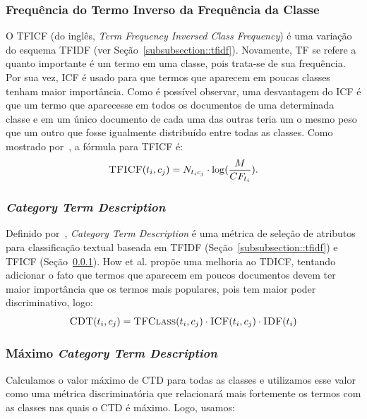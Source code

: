 \subsubsection{Frequência do Termo Inverso da Frequência da Classe}%
\label{subsubsection::tficf}

O \textsc{TFICF} (do inglês, \textit{Term Frequency Inversed Class Frequency}) é uma variação do esquema \textsc{TFIDF} (ver Seção~\ref{subsubsection::tfidf}). Novamente, \textsc{TF} se refere a quanto importante é um termo em uma classe, pois trata-se de sua frequência. Por sua vez, \textsc{ICF} é usado para que termos que aparecem em poucas classes tenham maior importância.
Como é possível observar, uma desvantagem do \textsc{ICF} é que um termo que aparecesse em todos os documentos de uma determinada classe e em um único documento de cada uma das outras teria um o mesmo peso que um outro que fosse igualmente distribuído entre todas as classes. 
Como mostrado por~\cite{ChihHow04}, a fórmula para \textsc{TFICF} é:
\begin{equation}\label{eqn::tficf}
 \textsc{TFICF}(t_i, c_j) = N_{t_ic_j} \cdot \log( \frac{M}{CF_{t_i}} ).
\end{equation}

\subsubsection{\textit{Category Term Description}}
\label{subsubsection::ctd}

Definido por~\cite{ChihHow04}, \textit{Category Term Description} é uma métrica de seleção de atributos para classificação textual baseada em \textsc{TFIDF} (Seção~\ref{subsubsection::tfidf}) e \textsc{TFICF} (Seção~\ref{subsubsection::tficf}). How et al. propõe uma melhoria ao TDICF, tentando adicionar o fato que termos que aparecem em poucos documentos devem ter maior importância que os termos mais populares, pois tem maior poder discriminativo, logo:
\begin{equation}\label{eqn::cdt}
 \textsc{CDT}(t_i, c_j) = \textsc{TFClass}(t_i, c_j) \cdot \textsc{ICF}(t_i, c_j) \cdot \textsc{IDF}(t_i)
\end{equation}

\subsubsection{Máximo \textit{Category Term Description}}
\label{subsubsection::maxctd}
Calculamos o valor máximo de \textsc{CTD} para todas as classes e utilizamos esse valor como uma métrica discriminatória que relacionará mais fortemente os termos com as classes nas quais o \textsc{CTD} é máximo. Logo, usamos:

